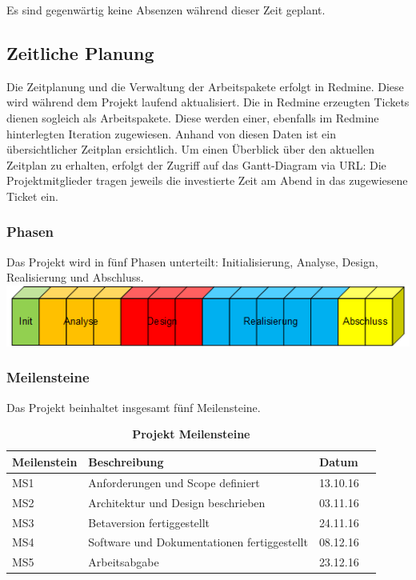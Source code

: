 \documentclass[a4,12pt]{scrartcl}
\begin{document}
\noindent Es sind gegenwärtig keine Absenzen während dieser Zeit geplant. 
\subsection{Zeitliche Planung}
Die Zeitplanung und die Verwaltung der Arbeitspakete erfolgt in Redmine. Diese wird während dem Projekt laufend aktualisiert. Die in Redmine erzeugten Tickets dienen sogleich als Arbeitspakete. Diese werden einer, ebenfalls im Redmine hinterlegten Iteration zugewiesen. Anhand von diesen Daten ist ein übersichtlicher Zeitplan ersichtlich. Um einen Überblick über den aktuellen Zeitplan zu erhalten, erfolgt der Zugriff auf das Gantt-Diagram via URL:
Die Projektmitglieder tragen jeweils die investierte Zeit am Abend in das zugewiesene Ticket ein. 

\subsubsection{Phasen}
Das Projekt wird in fünf Phasen unterteilt: Initialisierung, Analyse, Design, Realisierung und Abschluss.
\newline
\newline
\includegraphics[width=1\textwidth]{figures/phasen.png}
\newpage

\subsubsection{Meilensteine}
Das Projekt beinhaltet insgesamt fünf Meilensteine. \\
\begin{table}[H]
    \begin{tabular}{@{} l l l r@{}}\toprule    
    {Meilenstein} & {Beschreibung} & {Datum}\\ \midrule
    MS1 & Anforderungen und Scope definiert  & 13.10.16\\ \addlinespace
    MS2 & Architektur und Design beschrieben & 03.11.16\\ \addlinespace
    MS3 & Betaversion fertiggestellt  & 24.11.16\\ \addlinespace
    MS4 & Software und Dokumentationen fertiggestellt  & 08.12.16\\ \addlinespace
    MS5 & Arbeitsabgabe & 23.12.16\\ 
    \bottomrule
    \end{tabular}
\caption{\textbf{Projekt Meilensteine}}
\end{table}
\end{document}
